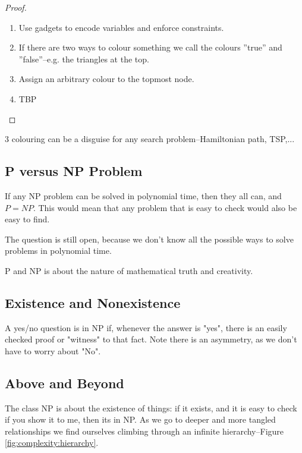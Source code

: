 \documentclass[]{article}
\begin{document}
\begin{proof}
	\begin{enumerate}
		\item Use gadgets to encode variables and enforce constraints.
		\item If there are two ways to colour something we call the colours ''true'' and ''false''--e.g. the triangles at the top.
		\item Assign an arbitrary colour to the topmost node.
		\item TBP
	\end{enumerate}
\end{proof}

3 colouring can be a disguise for any search problem--Hamiltonian path, TSP,...

\subsection{P versus NP Problem}

If any NP problem can be solved in polynomial time, then they all can, and $P=NP$. This would mean that any problem that is easy to check would also be easy to find.

The question is still open, because we don't know all the possible ways to solve problems in polynomial time.

P and NP is about the nature of mathematical truth and creativity.

\subsection{Existence and Nonexistence }

A yes/no question is in NP if, whenever the answer is "yes", there is an easily checked proof or "witness" to that fact. Note there is an asymmetry, as we don't have to worry about "No". 

\subsection{Above and Beyond}

The class NP is about the existence of things: if it exists, and it is easy to check if you show it to me, then its in NP. As we go to deeper and more tangled relationships we find ourselves climbing through an infinite hierarchy--Figure \ref{fig:complexity:hierarchy}.
\end{document}
